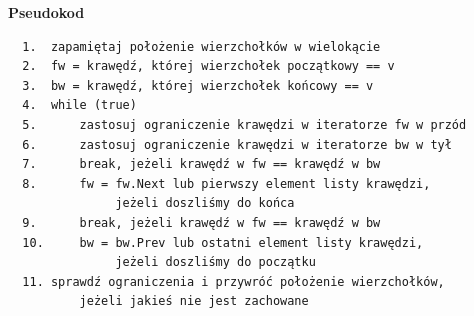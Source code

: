 \documentclass[12pt]{article}
\begin{document}
\textbf{Pseudokod}
\begin{verbatim}
  1.  zapamiętaj położenie wierzchołków w wielokącie
  2.  fw = krawędź, której wierzchołek początkowy == v
  3.  bw = krawędź, której wierzchołek końcowy == v
  4.  while (true)
  5.      zastosuj ograniczenie krawędzi w iteratorze fw w przód
  6.      zastosuj ograniczenie krawędzi w iteratorze bw w tył
  7.      break, jeżeli krawędź w fw == krawędź w bw
  8.      fw = fw.Next lub pierwszy element listy krawędzi,
               jeżeli doszliśmy do końca
  9.      break, jeżeli krawędź w fw == krawędź w bw
  10.     bw = bw.Prev lub ostatni element listy krawędzi,
               jeżeli doszliśmy do początku
  11. sprawdź ograniczenia i przywróć położenie wierzchołków,
          jeżeli jakieś nie jest zachowane
\end{verbatim}
\end{document}
